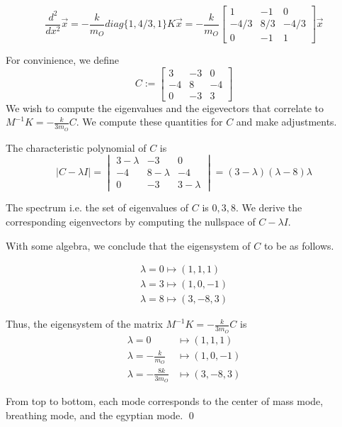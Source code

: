 \documentclass{article}
\begin{document}
\[
    \boxed{
    \frac{d^2}{dx^2}\vec{x} = 
    -\frac{k}{m_O} diag\{1, 4/3, 1\} K\vec{x} 
    = 
-\frac{k}{m_O}
 \begin{bmatrix}
        1 & -1 & 0\\
        -4/3 & 8/3 & -4/3\\
        0 & -1 & 1
    \end{bmatrix}
    \vec{x}
    }
\]

For convinience, we define 
\[
    C := \begin{bmatrix}
        3& -3& 0\\ 
        -4 & 8 & -4 \\
        0 & -3 & 3
    \end{bmatrix}
\]
We wish to compute the eigenvalues and the eigevectors 
that correlate to $M^{-1}K = -\frac{k}{3m_O} C$. We compute 
these quantities for $C$ and make adjustments. 

The characteristic polynomial of $C$ is 
\[
    |C - \lambda I| = \begin{vmatrix}
        3- \lambda& -3& 0\\ 
        -4 & 8 - \lambda& -4 \\
        0 & -3 & 3 - \lambda
    \end{vmatrix}
    = (3 - \lambda)(\lambda - 8)\lambda
\]

The spectrum i.e. the set of eigenvalues of $C$ is 
${0, 3, 8}$. We derive the corresponding eigenvectors 
by computing the nullspace of $C - \lambda I$. 

With some algebra, we conclude that the eigensystem of $C$
to be as follows. 

\begin{align*}
    \lambda = 0 \mapsto (1, 1, 1) \\
    \lambda = 3 \mapsto (1, 0, -1) \\ 
    \lambda = 8 \mapsto (3, -8, 3)
\end{align*}

Thus, the eigensystem of the matrix $M^{-1}K = -\frac{k}{3m_O} C$
is 
\begin{align*}
    \lambda = 0 &\mapsto (1, 1, 1) \\
    \lambda = -\frac{k}{m_O}&\mapsto (1, 0, -1) \\ 
    \lambda = -\frac{8k}{3m_O} &
\mapsto (3, -8, 3)
\end{align*}

From top to bottom, each mode corresponds to the center of mass mode, 
breathing mode, and the egyptian mode. \qed
\end{document}
